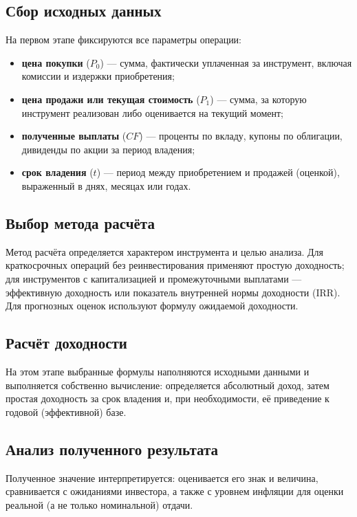 \documentclass[14pt, a4paper]{extarticle}
\begin{document}
\subsection{Сбор исходных данных}

На первом этапе фиксируются все параметры операции:
\begin{itemize}
  \item \textbf{цена покупки} ($P_0$) — сумма, фактически уплаченная за
        инструмент, включая комиссии и издержки приобретения;
  \item \textbf{цена продажи или текущая стоимость} ($P_1$) — сумма, за
        которую инструмент реализован либо оценивается на текущий момент;
  \item \textbf{полученные выплаты} ($CF$) — проценты по вкладу, купоны по
        облигации, дивиденды по акции за период владения;
  \item \textbf{срок владения} ($t$) — период между приобретением и продажей
        (оценкой), выраженный в днях, месяцах или годах.
\end{itemize}

\subsection{Выбор метода расчёта}

Метод расчёта определяется характером инструмента и целью анализа. Для
краткосрочных операций без реинвестирования применяют простую доходность; для
инструментов с капитализацией и промежуточными выплатами — эффективную
доходность или показатель внутренней нормы доходности (IRR). Для прогнозных
оценок используют формулу ожидаемой доходности.

\subsection{Расчёт доходности}

На этом этапе выбранные формулы наполняются исходными данными и выполняется
собственно вычисление: определяется абсолютный доход, затем простая доходность
за срок владения и, при необходимости, её приведение к годовой (эффективной)
базе.

\subsection{Анализ полученного результата}

Полученное значение интерпретируется: оценивается его знак и величина,
сравнивается с ожиданиями инвестора, а также с уровнем инфляции для оценки
реальной (а не только номинальной) отдачи.
\end{document}
